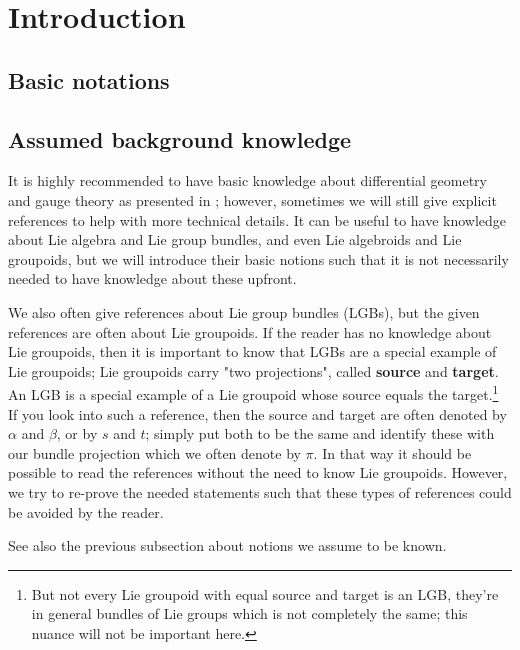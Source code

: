 \documentclass[a4paper,oneside,11pt,bibliography=totoc]{scrartcl}
\theoremstyle{plain}
\theoremstyle{remark}
\theoremstyle{definition}
\begin{document}



\section{Introduction}

\subsection{Basic notations}

\subsection{Assumed background knowledge}

It is highly recommended to have basic knowledge about differential geometry and gauge theory as presented in \cite[especially Chapter 1 to 5]{Hamilton}; however, sometimes we will still give explicit references to help with more technical details. It can be useful to have knowledge about Lie algebra and Lie group bundles, and even Lie algebroids and Lie groupoids, but we will introduce their basic notions such that it is not necessarily needed to have knowledge about these upfront.

We also often give references about Lie group bundles (LGBs), but the given references are often about Lie groupoids. If the reader has no knowledge about Lie groupoids, then it is important to know that LGBs are a special example of Lie groupoids; Lie groupoids carry "two projections", called \textbf{source} and \textbf{target}. An LGB is a special example of a Lie groupoid whose source equals the target.\footnote{But not every Lie groupoid with equal source and target is an LGB, they're in general bundles of Lie groups which is not completely the same; this nuance will not be important here.} If you look into such a reference, then the source and target are often denoted by $\alpha$ and $\beta$, or by $s$ and $t$; simply put both to be the same and identify these with our bundle projection which we often denote by $\pi$. In that way it should be possible to read the references without the need to know Lie groupoids. However, we try to re-prove the needed statements such that these types of references could be avoided by the reader.

See also the previous subsection about notions we assume to be known.

\end{document}
